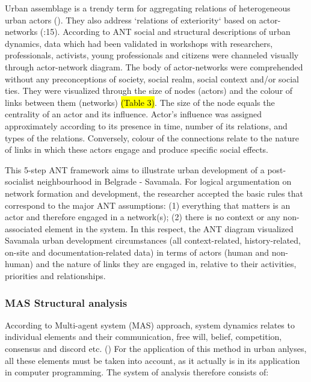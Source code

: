 \documentclass[11pt]{report}
\begin{document}
\begin{enumerate}
Urban assemblage is a trendy term for aggregating relations of heterogeneous urban actors (\cite{Muniesa et al. 2007}). They also address `relations of exteriority` based on actor-networks (\cite{Farías 2011}:15).
According to ANT social and structural descriptions of urban dynamics, data which had been validated in workshops with researchers, professionals, activists, young professionals and citizens were channeled visually through actor-network diagram. The body of actor-networks were comprehended without any preconceptions of society, social realm, social context and/or social ties. They were visualized through the size of nodes (actors) and the colour of links between them (networks) \hl{(Table 3)}. The size of the node equals the centrality of an actor and its influence. Actor’s influence was assigned approximately according to its presence in time, number of its relations, and types of the relations. Conversely, colour of the connections relate to the nature of links in which these actors engage and produce specific social effects.
\end{enumerate}

This 5-step ANT framework aims to illustrate urban development of a post-socialist neighbourhood in Belgrade - Savamala. For logical argumentation on network formation and development, the researcher accepted the basic rules that correspond to the major ANT assumptions:
(1) everything that matters is an actor and therefore engaged in a network(s);
(2) there is no context or any non-associated element in the system. In this respect, the ANT diagram visualized Savamala urban development circumstances (all context-related, history-related, on-site and documentation-related data) in terms of actors (human and non-human) and the nature of links they are engaged in, relative to their activities, priorities and relationships.


\subsubsection{MAS Structural analysis}

According to Multi-agent system (MAS) approach, system dynamics relates to individual elements and their communication, free will, belief, competition, consensus and discord etc. (\cite{Ferber 1999})
For the application of this method in urban anlyses, all these elements must be taken into account, as it actually is in its application in computer programming. The system of analysis therefore consists of:
\end{document}

